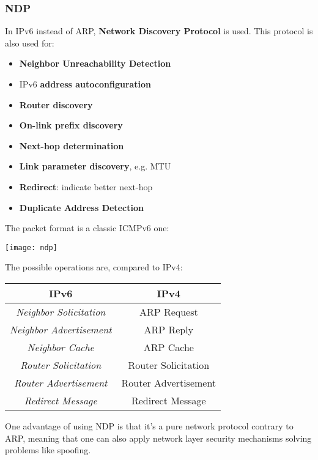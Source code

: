\subsubsection{NDP}
In IPv6 instead of ARP, \textbf{Network Discovery Protocol} is used. This protocol is also used for:
\begin{itemize}
	\item \textbf{Neighbor Unreachability Detection}
	\item IPv6 \textbf{address autoconfiguration}
	\item \textbf{Router discovery}
	\item \textbf{On-link prefix discovery}
	\item \textbf{Next-hop determination}
	\item \textbf{Link parameter discovery}, e.g. MTU
	\item \textbf{Redirect}: indicate better next-hop
	\item \textbf{Duplicate Address Detection}
\end{itemize}

\noindent The packet format is a classic ICMPv6 one:
\begin{center}
	\texttt{[image: ndp]}
\end{center}
The possible operations are, compared to IPv4:
\begin{table}[!h]
	\centering
	\begin{tabular}{|c|c|}
		\hline
		\textbf{IPv6} & \textbf{IPv4} \\
		\hline
		\textit{Neighbor Solicitation} & ARP Request \\
		\hline
		\textit{Neighbor Advertisement} & ARP Reply \\
		\hline
		\textit{Neighbor Cache} & ARP Cache \\
		\hline
		\textit{Router Solicitation}& Router Solicitation \\
		\hline
		\textit{Router Advertisement} & Router Advertisement \\
		\hline
		\textit{Redirect Message} & Redirect Message\\
		\hline
	\end{tabular}
\end{table}

\begin{note}
	One advantage of using NDP is that it's a pure network protocol contrary to ARP, meaning that one can also apply network layer security mechanisms solving problems like spoofing.
\end{note}

